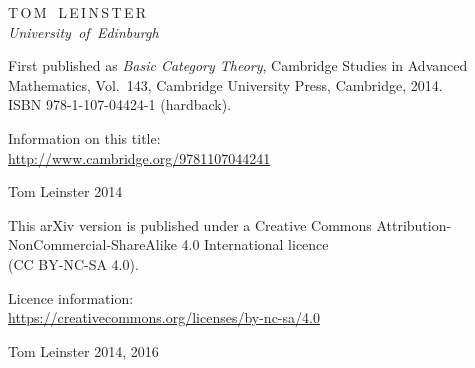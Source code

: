 % 
% 
% 

\thispagestyle{empty}

{\centering
\vspace*{20mm}


\vspace*{12mm}

{\large T\,O\,M \, L\,E\,I\,N\,S\,T\,E\,R}\\
\textit{University \,of \,Edinburgh}

}


\newpage
\thispagestyle{empty}

{\centering\small

First published as \emph{Basic Category Theory}, Cambridge Studies in
Advanced Mathematics, Vol.~143, Cambridge University Press, Cambridge,
2014.\\  
ISBN 978-1-107-04424-1 (hardback).

\bigskip

Information on this title:\\
\href{http://www.cambridge.org/9781107044241}{http://www.cambridge.org/9781107044241}
% 

\bigskip

\textcopyright{} Tom Leinster 2014


\vspace*{20mm}


This arXiv version is published under a Creative Commons
Attribution-NonCommercial-ShareAlike 4.0 International licence\\ 
(CC BY-NC-SA 4.0).

\bigskip

Licence information:\\
\href{https://creativecommons.org/licenses/by-nc-sa/4.0/}{https://creativecommons.org/licenses/by-nc-sa/4.0}

\bigskip

\textcopyright{} Tom Leinster 2014, 2016

}

